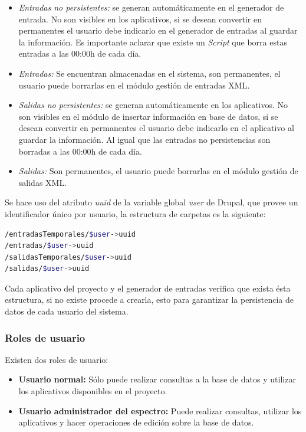 \begin{itemize}
	\item \textit{Entradas no persistentes:} se generan automáticamente en el generador de entrada. No son visibles en los aplicativos, si se desean convertir en permanentes el usuario debe indicarlo en el generador de entradas al guardar la información. Es importante aclarar que existe un \textit{Script} que borra estas entradas a las 00:00h de cada día.
	\item \textit{Entradas:} Se encuentran almacenadas en el sistema, son permanentes, el usuario puede borrarlas en el módulo gestión de entradas XML.
	\item \textit{Salidas no persistentes:} se generan automáticamente en los aplicativos. No son visibles en el módulo de insertar información en base de datos, si se desean convertir en permanentes el usuario debe indicarlo en el aplicativo al guardar la información. Al igual que las entradas no persistencias son borradas a las 00:00h de cada día.
	\item \textit{Salidas:} Son permanentes, el usuario puede borrarlas en el módulo gestión de salidas XML.
\end{itemize}

Se hace uso del atributo \textit{uuid} de la variable global \textit{user} de Drupal, que provee un identificador único por usuario, la estructura de carpetas es la siguiente:

\lstset{frameround=fttt}
\begin{lstlisting}[frame=trBL, language=bash]
/entradasTemporales/$user->uuid
/entradas/$user->uuid
/salidasTemporales/$user->uuid
/salidas/$user->uuid
\end{lstlisting}

Cada aplicativo del proyecto y el generador de entradas verifica que exista ésta estructura, si no existe procede a crearla, esto para garantizar la persistencia de datos de cada usuario del sistema.

\subsubsection{Roles de usuario}

Existen dos roles de usuario:

\begin{itemize}
	\item \textbf{Usuario normal:} Sólo puede realizar consultas a la base de datos y utilizar los aplicativos disponibles en el proyecto.
	\item \textbf{Usuario administrador del espectro:} Puede realizar consultas, utilizar los aplicativos y hacer operaciones de edición sobre la base de datos.
\end{itemize}

